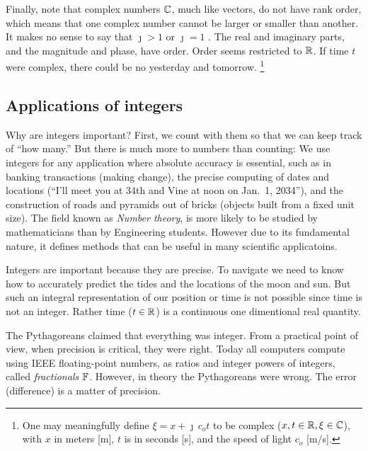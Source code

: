 \documentclass{ximera}
\begin{document}
Finally, note that complex numbers $\mathbb{C}$, much like vectors, do not have rank order, which means that
one complex number cannot be larger or smaller than another. 
It makes no sense to say that $\jmath > 1$ or $\jmath=1$ \citep{Boas87}.
The real and imaginary parts, and the magnitude and phase, have order.  Order seems restricted to $\mathbb{R}$.
If time $t$ were complex, there could be no yesterday and tomorrow.%
 \footnote{One may meaningfully define $\xi = x+\jmath\, c_o t$ to be complex ($x,t\in\mathbb{R}, \xi\in\mathbb{C}$),
  with $x$ in meters [m], $t$ is in seconds [s], and the speed of light $c_o$ [m/s].
	}

\subsection{Applications of integers}
Why are integers important?
First, we count with them so that we can keep track of ``how many.''
But there is much more to numbers than counting: We use integers for any application where absolute
accuracy is essential, such as in banking transactions (making change),
the precise computing of dates \citep[p.~70]{JS10} and locations (``I'll meet you at 34th and Vine
at noon on Jan.~1, 2034''), and the construction of roads and
pyramids out of bricks (objects built from a fixed unit size).
The field known as \emph{Number theory}, is more likely to be studied by mathematicians than by Engineering students.
However due to its fundamental nature, it defines methods that can be useful in many scientific applicatoins.

Integers are important because they are precise.
To navigate we need to know how to accurately predict the tides and the locations of the moon and sun. 
But such an integral representation of our position or time is not possible since time is not an integer.
Rather time ($t \in \mathbb{R}$) is a continuous one dimentional real quantity.

The Pythagoreans claimed that everything was integer. From a practical point of view, when precision is critical, they were right.
Today all computers compute using IEEE floating-point numbers, as ratios and integer powers of integers, called \emph{fractionals $\mathbb{F}$}.
However, in theory the Pythagoreans were wrong.
The error (difference) is a matter of precision.
\end{document}
